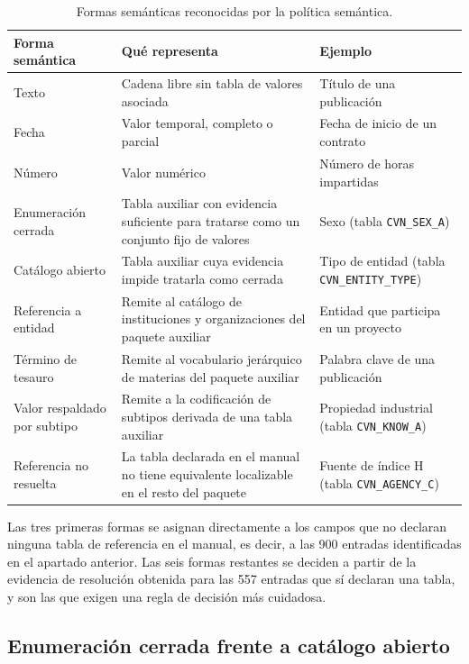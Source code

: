 \begin{table}[htbp]
  \centering
  \small
  \renewcommand{\arraystretch}{1.2}
  \begin{tabular}{p{} p{} p{}}
    \hline
    \textbf{Forma semántica} & \textbf{Qué representa} & \textbf{Ejemplo} \\
    \hline
    Texto & Cadena libre sin tabla de valores asociada & Título de una publicación \\
    Fecha & Valor temporal, completo o parcial & Fecha de inicio de un contrato \\
    Número & Valor numérico & Número de horas impartidas \\
    Enumeración cerrada & Tabla auxiliar con evidencia suficiente para tratarse como un conjunto fijo de valores & Sexo (tabla \texttt{CVN\_SEX\_A}) \\
    Catálogo abierto & Tabla auxiliar cuya evidencia impide tratarla como cerrada & Tipo de entidad (tabla \texttt{CVN\_ENTITY\_TYPE}) \\
    Referencia a entidad & Remite al catálogo de instituciones y organizaciones del paquete auxiliar & Entidad que participa en un proyecto \\
    Término de tesauro & Remite al vocabulario jerárquico de materias del paquete auxiliar & Palabra clave de una publicación \\
    Valor respaldado por subtipo & Remite a la codificación de subtipos derivada de una tabla auxiliar & Propiedad industrial (tabla \texttt{CVN\_KNOW\_A}) \\
    Referencia no resuelta & La tabla declarada en el manual no tiene equivalente localizable en el resto del paquete & Fuente de índice H (tabla \texttt{CVN\_AGENCY\_C}) \\
    \hline
  \end{tabular}
  \caption{Formas semánticas reconocidas por la política semántica.}
  \label{tab:pipeline_formas_semanticas}
\end{table}

Las tres primeras formas se asignan directamente a los campos que no
declaran ninguna tabla de referencia en el manual, es decir, a las 900
entradas identificadas en el apartado anterior. Las seis formas restantes se
deciden a partir de la evidencia de resolución obtenida para las 557 entradas
que sí declaran una tabla, y son las que exigen una regla de decisión más
cuidadosa.

\subsection{Enumeración cerrada frente a catálogo abierto}
\label{sec:pipeline_politica_enum}


